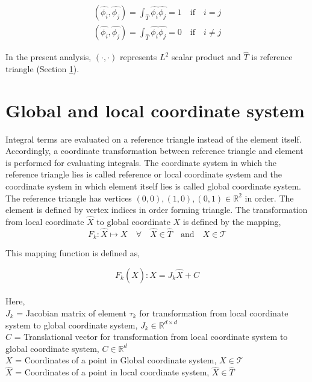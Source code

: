 \documentclass[a4paper,openany]{book}
\begin{document}
\begin{equation}
\begin{split}
(\hat{\phi_i } , \hat{\phi_j}) = \int_{\hat{T}} \hat{\phi_i} \hat{\phi_j} = 1 \quad \textrm{if} \quad i = j \\
(\hat{\phi_i } , \hat{\phi_j}) = \int_{\hat{T}} \hat{\phi_i} \hat{\phi_j} = 0 \quad \textrm{if} \quad i \neq j 
\end{split}
\end{equation}

In the present analysis, $(\cdot,\cdot)$ represents $L^2$ scalar product and $\hat{T}$ is reference triangle (Section \ref{section_glob_loc}). 

\section{Global and local coordinate system} \label{section_glob_loc}

Integral terms are evaluated on a reference triangle instead of the element itself. Accordingly, a coordinate transformation between reference triangle and element is performed for evaluating integrals. The coordinate system in which the reference triangle lies is called reference or local coordinate system and the coordinate system in which element itself lies is called global coordinate system. The reference triangle has vertices $(0,0),(1,0),(0,1) \in \mathbb{R}^2$ in order. The element is defined by vertex indices in order forming triangle. The transformation from local coordinate $\hat{X}$ to global coordinate $X$ is defined by the mapping,
\begin{equation}\label{local global mapping}
F_k:\hat{X} \mapsto X \quad \forall \quad \hat{X} \in \hat{T} \quad \textrm{and} \quad X \in \mathcal{T}
\end{equation}

This mapping function is defined as,

\begin{equation}\label{local global mapping equation}
F_k(\hat{X}): X = J_k \hat{X} + C
\end{equation}
${}$\\
Here,\\
$J_k$ = Jacobian matrix of element $\tau_k$ for transformation from local coordinate system to global coordinate system, $J_k \in \mathbb{R}^{d \times d}$\\
$C$ = Translational vector for transformation from local coordinate system to global coordinate system, $C \in \mathbb{R}^d$\\
$X$ = Coordinates of a point in Global coordinate system, $X \in \mathcal{T}$ \\
$\hat{X}$ = Coordinates of a point in local coordinate system, $\hat{X} \in \hat{T}$\\
\end{document}
